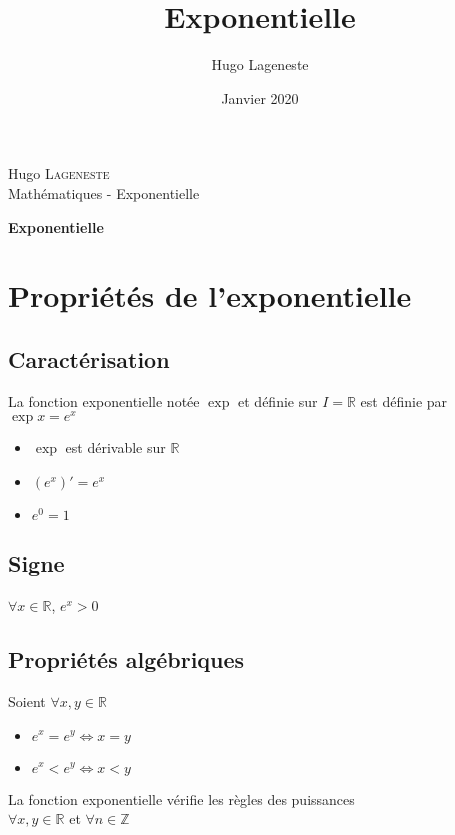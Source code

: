 \documentclass[a4paper]{article}
\title{Exponentielle}
\author{Hugo Lageneste}
\date{Janvier 2020}
\begin{document}
{Hugo \textsc{Lageneste}}\\
{Mathématiques - Exponentielle}

\begin{center}
 \newcommand{\HRule}{\rule{\linewidth}{0.5mm}}
 {\huge \bfseries Exponentielle}\\[0.1cm]
\end{center}

\section{Propriétés de l'exponentielle}
\subsection{Caractérisation}

{La fonction exponentielle notée $\exp{}$ et définie sur $I=\mathbb{R}$ est définie par $\exp{x}=e^x$}

\begin{multicols}{3}
	\begin{itemize}
  		\item{$\exp{}$ est dérivable sur $\mathbb{R}$}
  		\item{$\left(e^{x}\right)\prime=e^x$}
  		\item{$e^0=1$}
	\end{itemize}
\end{multicols}

\subsection{Signe}

{$\forall x \in \mathbb{R}$, $e^x > 0$}

\begin{center}
\end{center}

\subsection{Propriétés algébriques}

{Soient $\forall x, y \in \mathbb{R}$}

\begin{multicols}{2}
	\begin{itemize}
  		\item{$e^x = e^y \Leftrightarrow x=y$}
  		\item{$e^x < e^y \Leftrightarrow x < y$}
	\end{itemize}
\end{multicols}
{La fonction exponentielle vérifie les règles des puissances}\\
{$\forall x,y \in \mathbb{R}$ et $\forall n \in \mathbb{Z}$}
\end{document}
